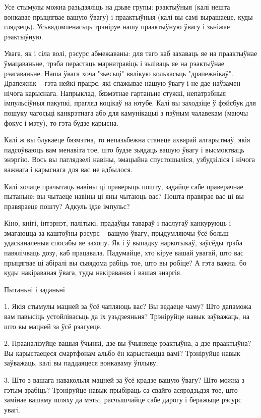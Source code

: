 Усе стымулы можна разьдзяліць на дзьве групы: рэактыўныя (калі нешта вонкавае прыцягвае вашую ўвагу) і праактыўныя (калі вы самі вырашаеце, куды глядзець). Усьвядомленасьць трэніруе нашу праактыўную ўвагу і зьніжае рэактыўную.

Увага, як і сіла волі, рэсурс абмежаваны: для таго каб захаваць яе на праактыўнае ўмацаваньне, трэба перастаць марнатравіць і зьліваць яе на рэактыўнае рэагаваньне. Наша ўвага хоча "зьесьці" вялікую колькасьць "драпежнікаў". Драпежнік – гэта нейкі працэс, які спажывае нашую ўвагу і не дае наўзамен нічога карыснага. Напрыклад, бязмэтнае гартаньне стужкі, непатрэбныя імпульсіўныя пакупкі, прагляд коцікаў на ютубе. Калі вы заходзіце ў фэйсбук для пошуку чагосьці канкрэтнага або для камунікацыі з пэўным чалавекам (маючы фокус і мэту), то гэта будзе карысна.

Калі ж вы блукаеце бязмэтна, то непазьбежна станеце ахвярай алгарытмаў, якія падсоўваюць вам менавіта тое, што будзе зьядаць вашую ўвагу і высмоктваць энэргію. Вось вы паглядзелі навіны, эмацыйна спустошыліся, узбудзіліся і нічога важнага і карыснага для вас не адбылося. 

Калі хочаце прачытаць навіны ці праверыць пошту, задайце сабе праверачнае пытаньне: вы чытаеце навіны ці яны чытаюць вас? Пошта правярае вас ці вы правяраеце пошту? Адкуль ідзе імпульс?

Кіно, кнігі, інтэрнэт, палітыкі, прадаўцы тавараў і паслугаў канкуруюць і змагаюцца за каштоўны рэсурс – вашую ўвагу, прыдумляючы ўсё больш удасканаленыя спосабы яе захопу. Як і ў выпадку наркотыкаў, заўсёды трэба павялічваць дозу, каб працавала. Падумайце, хто кіруе вашай увагай, што вас прыцягвае ці абіралі вы сьвядома рабіць тое, што вы робіце? А гэта важна, бо куды накіраваная ўвага, туды накіраваная і вашая энэргія.

Пытаньні і заданьні

1. Якія стымулы мацней за ўсё чапляюць вас? Вы ведаеце чаму? Што дапаможа вам павысіць устойлівасьць да іх узьдзеяньня? Трэніруйце навык заўважаць, на што вы мацней за ўсё рэагуеце.

2. Прааналізуйце вашыя ўчынкі, дзе вы ўчыняеце рэактыўна, а дзе праактыўна? Вы карыстаецеся смартфонам альбо ён карыстаецца вамі? Трэніруйце навык заўважаць, калі вы паддаяцеся вонкаваму ўплыву.

3. Што з вашага навакольля мацней за ўсё крадзе вашую ўвагу? Што можна з гэтым зрабіць? Трэніруйце навык прыбіраць са свайго асяродзьдзя тое, што замінае вашаму шляху да мэты, расчышчайце сабе дарогу і беражыце рэсурс увагі.


